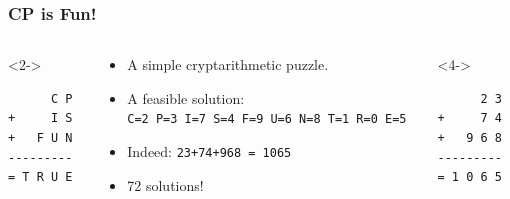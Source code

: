 \documentclass[utf8x,xcolor=dvipsnames]{beamer}
\newcommand{\code}[1]{\texttt{#1}}
\begin{document}
\begin{frame}[fragile]
\frametitle{CP is Fun!}
 \begin{columns}
 \begin{column}{0.15\textwidth}
\begin{uncoverenv}<2->
  \begin{verbatim}
      C P
+     I S
+   F U N
---------
= T R U E
  \end{verbatim}
\end{uncoverenv}
 \end{column}
\begin{column}{0.70\textwidth}
 \begin{itemize}
      \item<1-> A simple cryptarithmetic puzzle.
      \item<3-> A feasible solution:\\ \code{C=2 P=3 I=7 S=4 F=9 U=6 N=8 T=1 R=0 E=5}
      \item<4-> Indeed: \code{23+74+968 = 1065}
      \item<5-> 72 solutions! 
    \end{itemize}
 \end{column}
 \begin{column}{0.15\textwidth}
\begin{uncoverenv}<4->
  \begin{verbatim}
      2 3
+     7 4
+   9 6 8
---------
= 1 0 6 5
  \end{verbatim}
\end{uncoverenv}
 \end{column}
\end{columns}
\end{frame}
\end{document}
